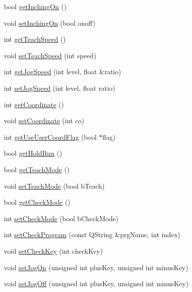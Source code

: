 \begin{DoxyCompactItemize}
bool \hyperlink{classCUIApp_a0e1919fc8bffe64510862903d2997746}{get\-Inching\-On} ()
\item 
void \hyperlink{classCUIApp_a875b8e4442379f90ce94c841bfb275ee}{set\-Inching\-On} (bool onoff)
\item 
int \hyperlink{classCUIApp_aed3628c3a5b2a214d95b66c158261469}{get\-Teach\-Speed} ()
\item 
void \hyperlink{classCUIApp_a48f2c72b1eedf48487c308c565102b04}{set\-Teach\-Speed} (int speed)
\item 
int \hyperlink{classCUIApp_a5a1b0c3f5b9ba0160e7fd04ce9045ad5}{get\-Jog\-Speed} (int level, float \&ratio)
\item 
int \hyperlink{classCUIApp_a7df9ad69084f03b2e610d0bc35769320}{set\-Jog\-Speed} (int level, float ratio)
\item 
int \hyperlink{classCUIApp_aa4adccaece246aa22b93d16219755521}{get\-Coordinate} ()
\item 
void \hyperlink{classCUIApp_a20ea8f0c390d9ef552a006f153f4fbdf}{set\-Coordinate} (int co)
\item 
int \hyperlink{classCUIApp_afae22d445cdef37f9c797084f16fc055}{get\-Use\-User\-Coord\-Flag} (bool $\ast$flag)
\item 
bool \hyperlink{classCUIApp_a51873975bdae2a082cf93ecd28592517}{get\-Hold\-Run} ()
\item 
bool \hyperlink{classCUIApp_a1e13081fe2b308c0ed6b48515d8e3ee1}{get\-Teach\-Mode} ()
\item 
void \hyperlink{classCUIApp_ac2f4c21479ef20f75ac6f5076835b15f}{set\-Teach\-Mode} (bool b\-Teach)
\item 
bool \hyperlink{classCUIApp_adaf17858538066ca486e6dba3cfe40bf}{get\-Check\-Mode} ()
\item 
int \hyperlink{classCUIApp_ab417f07d00c8d7804ee29dc16c9d1cef}{set\-Check\-Mode} (bool b\-Check\-Mode)
\item 
int \hyperlink{classCUIApp_a4806d708e39f2aa3392cdcfefe31fd28}{set\-Check\-Program} (const Q\-String \&prg\-Name, int index)
\item 
void \hyperlink{classCUIApp_af1cb9ef08858fc07b9fdb1a541c4f1a7}{set\-Check\-Key} (int check\-Key)
\item 
void \hyperlink{classCUIApp_a8810e1c9c6852373f02dd63c46b40aa9}{set\-Jog\-On} (unsigned int plus\-Key, unsigned int minus\-Key)
\item 
void \hyperlink{classCUIApp_a307e341b403a08fa1bb43738eff18698}{set\-Jog\-Off} (unsigned int plus\-Key, unsigned int minus\-Key)
\item 

\end{DoxyCompactItemize}
